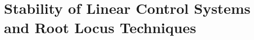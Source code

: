 \documentclass[../course]{subfiles}
\begin{document}
\chapter{Stability of Linear Control Systems and Root Locus Techniques} \label{chp:ch03StabilityRootLocus}


\end{document}
